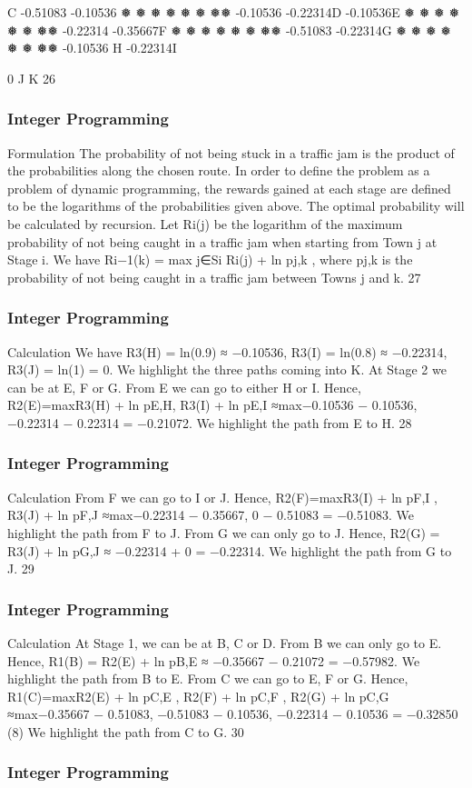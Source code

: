 \begin{frame}
C
-0.51083
-0.10536
❅
❅
❅
❅
❅
❅
❅❅
-0.10536
-0.22314D
-0.10536E
❅
❅
❅
❅
❅
❅
❅❅
-0.22314
-0.35667F
❅
❅
❅
❅
❅
❅
❅❅
-0.51083
-0.22314G
❅
❅
❅
❅
❅
❅
❅❅
-0.10536
H
-0.22314I







0
J
K
26 \end{frame}  \begin{frame} \frametitle{Integer Programming}     
Formulation
The probability of not being stuck in a traffic jam is the product of
the probabilities along the chosen route.
In order to define the problem as a problem of dynamic
programming, the rewards gained at each stage are defined to be
the logarithms of the probabilities given above.
The optimal probability will be calculated by recursion. Let Ri(j)
be the logarithm of the maximum probability of not being caught
in a traffic jam when starting from Town j at Stage i. We have
Ri−1(k) = max
j∈Si
{Ri(j) + ln pj,k },
where pj,k is the probability of not being caught in a traffic jam
between Towns j and k.
27 \end{frame}  \begin{frame} \frametitle{Integer Programming}     
Calculation
We have R3(H) = ln(0.9) ≈ −0.10536,
R3(I) = ln(0.8) ≈ −0.22314, R3(J) = ln(1) = 0.
We highlight the three paths coming into K.
At Stage 2 we can be at E, F or G. From E we can go to either H
or I. Hence,
R2(E)=max{R3(H) + ln pE,H, R3(I) + ln pE,I }
≈max{−0.10536 − 0.10536, −0.22314 − 0.22314} = −0.21072.
We highlight the path from E to H.
28 \end{frame}  \begin{frame} \frametitle{Integer Programming}     
Calculation
From F we can go to I or J. Hence,
R2(F)=max{R3(I) + ln pF,I
, R3(J) + ln pF,J }
≈max{−0.22314 − 0.35667, 0 − 0.51083} = −0.51083.
We highlight the path from F to J.
From G we can only go to J. Hence,
R2(G) = R3(J) + ln pG,J ≈ −0.22314 + 0 = −0.22314.
We highlight the path from G to J.
29 \end{frame}  \begin{frame} \frametitle{Integer Programming}     
Calculation
At Stage 1, we can be at B, C or D. From B we can only go to E.
Hence,
R1(B) = R2(E) + ln pB,E ≈ −0.35667 − 0.21072 = −0.57982.
We highlight the path from B to E.
From C we can go to E, F or G. Hence,
R1(C)=max{R2(E) + ln pC,E , R2(F) + ln pC,F , R2(G) + ln pC,G }
≈max{−0.35667 − 0.51083, −0.51083 − 0.10536,
−0.22314 − 0.10536} = −0.32850 (8)
We highlight the path from C to G.
30 \end{frame}  \begin{frame} \frametitle{Integer Programming}     

\end{frame}
